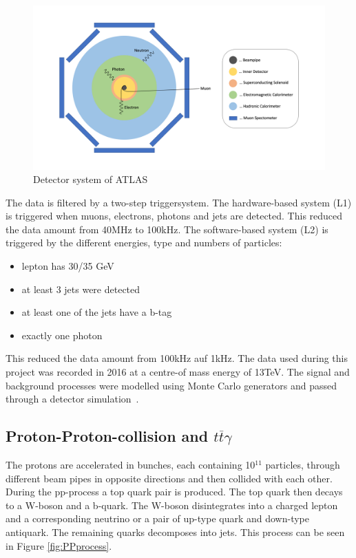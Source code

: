 \documentclass[11pt]{scrartcl}
\begin{document}
	\begin{figure}[H]
	\centering
	\includegraphics[width=1\textwidth]{figures/detector_system.png}
	\caption{Detector system of ATLAS}
	\label{fig:detectorsystem}
	\end{figure}
	
	The data is filtered by a two-step triggersystem. The hardware-based system (L1) is triggered when muons, electrons, photons and jets are detected. This reduced the data amount from 40MHz to 100kHz. The software-based system (L2) is triggered by the different energies, type and numbers of particles:
	
\begin{itemize}
  \item lepton has 30/35 GeV
  \item at least 3 jets were detected
  \item at least one of the jets have a b-tag
  \item exactly one photon
\end{itemize}

This reduced the data amount from 100kHz auf 1kHz. The data used during this project was recorded in 2016 at a centre-of mass energy of 13TeV. The signal and background processes were modelled using Monte Carlo generators and passed through a detector simulation~\cite{ATLAS}. 

	\subsection{Proton-Proton-collision and $t\overline{t}\gamma$}
	The protons are accelerated in bunches, each containing 10$^{11}$ particles, through different beam pipes in opposite directions and then collided with each other. During the pp-process a top quark pair is produced. The top quark then decays to a W-boson and a b-quark. The W-boson disintegrates into a charged lepton and a corresponding neutrino or a pair of up-type quark and down-type antiquark. The remaining quarks decomposes into jets. This process can be seen in Figure \ref{fig:PPprocess}.
	
\end{document}
